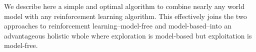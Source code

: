 \documentclass[fleqn,10pt]{wlscirep}
\begin{document}
We describe here a simple and optimal algorithm to combine nearly any world model with any reinforcement learning algorithm. This effectively joins the two approaches to reinforcement learning--model-free and model-based--into an advantageous holistic whole where exploration is model-based but exploitation is model-free.




\end{document}
